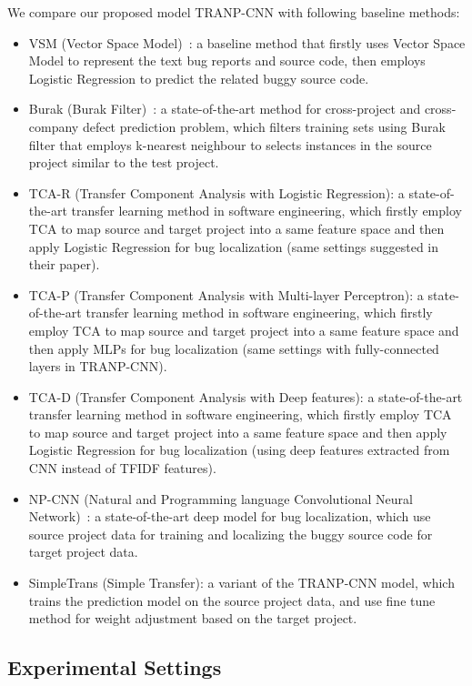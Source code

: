 We compare our proposed model TRANP-CNN with following baseline methods:
\begin{itemize}
  \item VSM (Vector Space Model)~\cite{rao2011retrieval}: a baseline method that firstly uses Vector Space Model to represent the text bug reports and source code, then employs Logistic Regression to predict the related buggy source code.
  \item Burak (Burak Filter)~\cite{peters2013better}: a state-of-the-art method for cross-project and cross-company defect prediction problem, which filters training sets using Burak filter that employs k-nearest neighbour to selects instances in the source project similar to the test project.
  \item TCA-R (Transfer Component Analysis with Logistic Regression): a state-of-the-art transfer learning method in software engineering, which firstly employ TCA to map source and target project into a same feature space and then apply Logistic Regression for bug localization (same settings suggested in their paper).
  \item TCA-P (Transfer Component Analysis with Multi-layer Perceptron): a state-of-the-art transfer learning method in software engineering, which firstly employ TCA to map source and target project into a same feature space and then apply MLPs for bug localization (same settings with fully-connected layers in TRANP-CNN).
   \item TCA-D (Transfer Component Analysis with Deep features): a state-of-the-art transfer learning method in software engineering, which firstly employ TCA to map source and target project into a same feature space and then apply Logistic Regression for bug localization (using deep features extracted from CNN instead of TFIDF features).
  \item NP-CNN (Natural and Programming language Convolutional Neural Network)~\cite{huo2016learning}: a state-of-the-art deep model for bug localization, which use source project data for training and localizing the buggy source code for target project data.
  \item SimpleTrans (Simple Transfer): a variant of the TRANP-CNN model, which trains the prediction model on the source project data, and use fine tune method for weight adjustment based on the target project.
\end{itemize}

\subsection{Experimental Settings}


